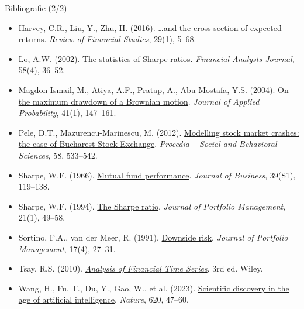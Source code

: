 \begin{frame}{Bibliografie (2/2)}
\itemsize{\tiny}
\begin{itemize}
    \item Harvey, C.R., Liu, Y., Zhu, H. (2016). \href{https://doi.org/10.1093/rfs/hhv059}{\ldots and the cross-section of expected returns}. \textit{Review of Financial Studies}, 29(1), 5--68.
    \item Lo, A.W. (2002). \href{https://doi.org/10.2469/faj.v58.n4.2453}{The statistics of Sharpe ratios}. \textit{Financial Analysts Journal}, 58(4), 36--52.
    \item Magdon-Ismail, M., Atiya, A.F., Pratap, A., Abu-Mostafa, Y.S. (2004). \href{https://doi.org/10.1239/jap/1077134674}{On the maximum drawdown of a Brownian motion}. \textit{Journal of Applied Probability}, 41(1), 147--161.
    \item Pele, D.T., Mazurencu-Marinescu, M. (2012). \href{https://doi.org/10.1016/j.sbspro.2012.09.1030}{Modelling stock market crashes: the case of Bucharest Stock Exchange}. \textit{Procedia -- Social and Behavioral Sciences}, 58, 533--542.
    \item Sharpe, W.F. (1966). \href{https://doi.org/10.1086/294846}{Mutual fund performance}. \textit{Journal of Business}, 39(S1), 119--138.
    \item Sharpe, W.F. (1994). \href{https://doi.org/10.3905/jpm.1994.409501}{The Sharpe ratio}. \textit{Journal of Portfolio Management}, 21(1), 49--58.
    \item Sortino, F.A., van der Meer, R. (1991). \href{https://doi.org/10.3905/jpm.1991.409343}{Downside risk}. \textit{Journal of Portfolio Management}, 17(4), 27--31.
    \item Tsay, R.S. (2010). \href{https://doi.org/10.1002/9780470644560}{\textit{Analysis of Financial Time Series}}, 3rd ed. Wiley.
    \item Wang, H., Fu, T., Du, Y., Gao, W., et al. (2023). \href{https://doi.org/10.1038/s41586-023-06221-2}{Scientific discovery in the age of artificial intelligence}. \textit{Nature}, 620, 47--60.
\end{itemize}
\end{frame}


